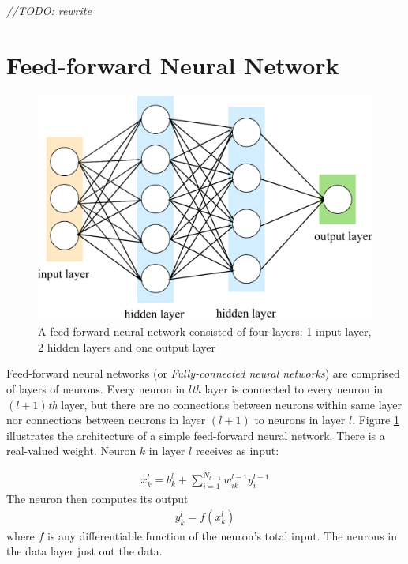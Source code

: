 \textit{//TODO: rewrite}
\section{Feed-forward Neural Network}
\begin{figure}
	\centering
	\includegraphics[width=0.75\linewidth]{Chapters/Fig/feedforward.eps}
	\caption{A feed-forward neural network consisted of four layers: 1 input layer, 2 hidden layers and one output layer}
	\label{fig:ff-net}
\end{figure}
Feed-forward neural networks (or \textit{Fully-connected neural networks}) are comprised of layers of neurons. Every neuron in $l$\textit{th} layer is connected to every neuron in $\left(l+1\right)$\textit{th} layer, but there are no connections between neurons within same layer nor connections between neurons in layer $\left(l+1\right)$ to neurons in layer $l$. Figure \ref{fig:ff-net} illustrates the architecture of a simple feed-forward neural network. There is a real-valued weight. Neuron $k$ in layer $l$ receives as input:

\begin{align*}
	x^l_k = b^l_k + \sum^{N_{t-1}}_{i=1} w^{l-1}_{ik}y^{l-1}_i
\end{align*}
The neuron then computes its output
\begin{align*}
y^l_k = f\left(x^l_k\right)
\end{align*}
where $f$ is any differentiable function of the neuron's total input. The neurons in the data layer just out the data.

